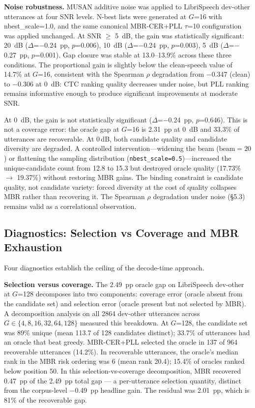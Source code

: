 \textbf{Noise robustness.} MUSAN additive noise \cite{snyder2015musan} was applied to LibriSpeech
dev-other utterances at four SNR levels. N-best lists were generated at $G$=16 with
nbest\_scale=1.0, and the same canonical MBR-CER+PLL $\tau$=10 configuration was applied
unchanged. At SNR $\geq$ 5~dB, the gain was statistically
significant: 20~dB ($\Delta$=$-$0.24~pp, $p$=0.006), 10~dB ($\Delta$=$-$0.24~pp, $p$=0.003),
5~dB ($\Delta$=$-$0.27~pp, $p$=0.001). Gap closure was stable at 13.0--13.9\% across these three
conditions. The proportional gain is slightly below the clean-speech value of 14.7\% at $G$=16,
consistent with the Spearman $\rho$ degradation from $-$0.347 (clean) to $-$0.306 at 0~dB: CTC
ranking quality decreases under noise, but PLL ranking remains informative enough to produce
significant improvements at moderate SNR.

At 0~dB, the gain is not statistically significant ($\Delta$=$-$0.24~pp, $p$=0.646). This is not
a coverage error: the oracle gap at $G$=16 is 2.31~pp at 0~dB and 33.3\% of utterances are
recoverable. At 0\,dB, both candidate quality and candidate diversity are degraded. A controlled intervention---widening the beam ($\text{beam}=20$) or flattening the sampling distribution (\texttt{nbest\_scale=0.5})---increased the unique-candidate count from 12.8 to 15.3 but destroyed oracle quality (17.73\% $\to$ 19.37\%) without restoring MBR gains. The binding constraint is candidate quality, not candidate variety: forced diversity at the cost of quality collapses MBR rather than recovering it. The Spearman $\rho$ degradation under noise (§5.3) remains valid as a correlational observation.



\subsection{Diagnostics: Selection vs Coverage and MBR Exhaustion}

Four diagnostics establish the ceiling of the decode-time approach.

\textbf{Selection versus coverage.} The 2.49~pp oracle gap on LibriSpeech dev-other at $G$=128
decomposes into two components: coverage error (oracle absent from the candidate set) and
selection error (oracle present but not selected by MBR). A decomposition analysis on all 2864 dev-other utterances across $G \in \{4, 8, 16, 32, 64, 128\}$ measured this breakdown. At $G$=128, the candidate set was 89\% unique (mean 113.7 of 128 candidates
distinct); 33.7\% of utterances had an oracle that beat greedy. MBR-CER+PLL selected the oracle
in 137 of 964 recoverable utterances (14.2\%). In recoverable utterances, the oracle's median
rank in the MBR risk ordering was 6 (mean rank 20.4); 15.4\% of oracles ranked below position
50. In this selection-vs-coverage decomposition, MBR recovered 0.47~pp of the 2.49~pp total
gap --- a per-utterance selection quantity, distinct from the corpus-level $-$0.49~pp headline
gain. The residual was 2.01~pp, which is 81\% of the recoverable gap.

